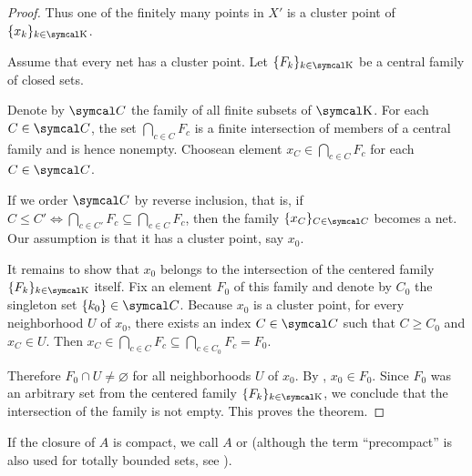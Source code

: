 \begin{proof}
  Thus one of the finitely many points in \( X' \) is a cluster point of \( \{ x_k \}_{k \in \CK} \).

   Assume that every net has a cluster point. Let \( \{ F_k \}_{k \in \CK} \) be a central family of closed sets.

  Denote by \( \Cal C \) the family of all finite subsets of \( \CK \). For each \( C \in \Cal C \), the set \( \bigcap_{c \in C} F_c \) is a finite intersection of members of a central family and is hence nonempty. Choose\AOC an element \( x_C \in \bigcap_{c \in C} F_c \) for each \( C \in \Cal C \).

  If we order \( \Cal C \) by reverse inclusion, that is, if \( C \leq C' \iff \bigcap_{c \in C'} F_c \subseteq \bigcap_{c \in C} F_c \), then the family \( \{ x_C \}_{C \in \Cal C} \) becomes a net. Our assumption is that it has a cluster point, say \( x_0 \).

  It remains to show that \( x_0 \) belongs to the intersection of the centered family \( \{ F_k \}_{k \in \CK} \) itself. Fix an element \( F_0 \) of this family and denote by \( C_0 \) the singleton set \( \{ k_0 \} \in \Cal C \). Because \( x_0 \) is a cluster point, for every neighborhood \( U \) of \( x_0 \), there exists an index \( C \in \Cal C \) such that \( C \geq C_0 \) and \( x_C \in U \). Then \( x_C \in \bigcap_{c \in C} F_c \subseteq \bigcap_{c \in C_0} F_c = F_0 \).

  Therefore \( F_0 \cap U \neq \varnothing \) for all neighborhoods \( U \) of \( x_0 \). By , \( x_0 \in F_0 \). Since \( F_0 \) was an arbitrary set from the centered family \( \{ F_k \}_{k \in \CK} \), we conclude that the intersection of the family is not empty. This proves the theorem.
\end{proof}

\begin{remark}\label{remark:precompact_set}
  If the closure of \( A \) is compact, we call \( A \)  or  (although the term \enquote{precompact} is also used for totally bounded sets, see ).
\end{remark}

